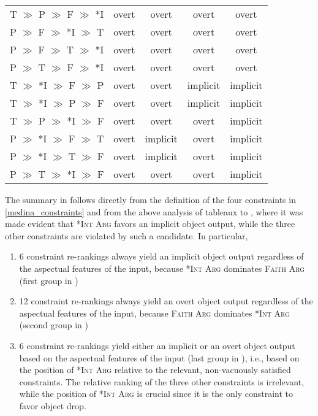 \begin{table}[htb]
\begin{tabular}{|l||c|c|c|c|}
T $\gg$ P $\gg$ F $\gg$ *I & overt  &  overt   & overt  & overt \\
P $\gg$ F $\gg$ *I $\gg$ T & overt  &  overt   & overt  & overt \\
P $\gg$ F $\gg$ T $\gg$ *I & overt  &  overt   & overt  & overt \\
P $\gg$ T $\gg$ F $\gg$ *I & overt  &  overt   & overt  & overt \\\hline
T $\gg$ *I $\gg$ F $\gg$ P & overt  &  overt   & implicit  & implicit \\
T $\gg$ *I $\gg$ P $\gg$ F & overt  &  overt   & implicit  & implicit \\ 
T $\gg$ P $\gg$ *I $\gg$ F & overt  &  overt   & overt  & implicit \\
P $\gg$ *I $\gg$ F $\gg$ T & overt  &  implicit   & overt  & implicit \\
P $\gg$ *I $\gg$ T $\gg$ F & overt  &  implicit   & overt  & implicit \\
P $\gg$ T $\gg$ *I $\gg$ F & overt  &  overt   & overt  & implicit \\\hline
\end{tabular}
\end{table}

The summary in  follows directly from the definition of the four constraints in \ref{medina_constraints} and from the above analysis of tableaux  to , where it was made evident that \textsc{*Int Arg} favors an implicit object output, while the three other constraints are violated by such a candidate. In particular,
\begin{enumerate}
    \item 6 constraint re-rankings always yield an implicit object output regardless of the aspectual features of the input, because \textsc{*Int Arg} dominates \textsc{Faith Arg} (first group in )
    \item 12 constraint re-rankings always yield an overt object output regardless of the aspectual features of the input, because \textsc{Faith Arg} dominates \textsc{*Int Arg} (second group in )
    \item 6 constraint re-rankings yield either an implicit or an overt object output based on the aspectual features of the input (last group in ), i.e., based on the position of \textsc{*Int Arg} relative to the relevant, non-vacuously satisfied constraints. The relative ranking of the three other constraints is irrelevant, while the position of \textsc{*Int Arg} is crucial since it is the only constraint to favor object drop.
\end{enumerate}

